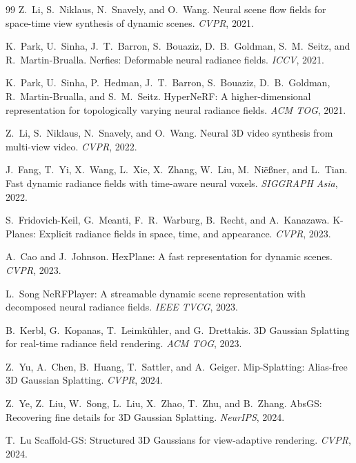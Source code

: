 \begin{thebibliography}{99}
Z.~Li, S.~Niklaus, N.~Snavely, and O.~Wang.
Neural scene flow fields for space-time view synthesis of dynamic scenes.
\emph{CVPR}, 2021.


K.~Park, U.~Sinha, J.~T.~Barron, S.~Bouaziz, D.~B.~Goldman, S.~M.~Seitz,
and R.~Martin-Brualla.
Nerfies: Deformable neural radiance fields.
\emph{ICCV}, 2021.


K.~Park, U.~Sinha, P.~Hedman, J.~T.~Barron, S.~Bouaziz, D.~B.~Goldman,
R.~Martin-Brualla, and S.~M.~Seitz.
HyperNeRF: A higher-dimensional representation for topologically varying neural
radiance fields.
\emph{ACM TOG}, 2021.


Z.~Li, S.~Niklaus, N.~Snavely, and O.~Wang.
Neural 3D video synthesis from multi-view video.
\emph{CVPR}, 2022.


J.~Fang, T.~Yi, X.~Wang, L.~Xie, X.~Zhang, W.~Liu, M.~Ni\"{e}{\ss}ner,
and L.~Tian.
Fast dynamic radiance fields with time-aware neural voxels.
\emph{SIGGRAPH Asia}, 2022.


S.~Fridovich-Keil, G.~Meanti, F.~R.~Warburg, B.~Recht, and A.~Kanazawa.
K-Planes: Explicit radiance fields in space, time, and appearance.
\emph{CVPR}, 2023.


A.~Cao and J.~Johnson.
HexPlane: A fast representation for dynamic scenes.
\emph{CVPR}, 2023.


L.~Song \etal
NeRFPlayer: A streamable dynamic scene representation with decomposed neural
radiance fields.
\emph{IEEE TVCG}, 2023.


B.~Kerbl, G.~Kopanas, T.~Leimk\"{u}hler, and G.~Drettakis.
3D Gaussian Splatting for real-time radiance field rendering.
\emph{ACM TOG}, 2023.


Z.~Yu, A.~Chen, B.~Huang, T.~Sattler, and A.~Geiger.
Mip-Splatting: Alias-free 3D Gaussian Splatting.
\emph{CVPR}, 2024.


Z.~Ye, Z.~Liu, W.~Song, L.~Liu, X.~Zhao, T.~Zhu, and B.~Zhang.
AbsGS: Recovering fine details for 3D Gaussian Splatting.
\emph{NeurIPS}, 2024.


T.~Lu \etal
Scaffold-GS: Structured 3D Gaussians for view-adaptive rendering.
\emph{CVPR}, 2024.



\end{thebibliography}
